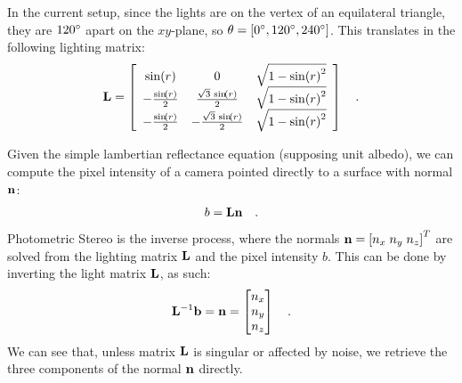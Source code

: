 \documentclass{report}
\begin{document}
In the current setup, since the lights are on the vertex of an equilateral triangle, they are $120\degree$ apart on the $xy$-plane, so $\theta = \left[ 0\degree, 120\degree, 240\degree \right]$. This translates in the following lighting matrix:
\begin{equation}
\B{L} =
\left[\begin{array}{ccc} \sin\!\left(r\right) & 0 & \sqrt{1 - {\sin\!\left(r\right)}^2}\\ -\frac{\sin\!\left(r\right)}{2} & \frac{\sqrt{3}\, \sin\!\left(r\right)}{2} & \sqrt{1 - {\sin\!\left(r\right)}^2}\\ -\frac{\sin\!\left(r\right)}{2} & -\frac{\sqrt{3}\, \sin\!\left(r\right)}{2} & \sqrt{1 - {\sin\!\left(r\right)}^2} \end{array}\right]
\quad .
\end{equation}

Given the simple lambertian reflectance equation (supposing unit albedo), we can compute the pixel intensity of a camera pointed directly to a surface with normal $\mathbf{n}$:
\begin{equation}
b = \mathbf{L}\mathbf{n}
\quad.
\end{equation}
Photometric Stereo is the inverse process, where the normals $\mathbf{n} = \left[ n_x \; n_y \; n_z\right]^T$ are solved from the lighting matrix $\mathbf{L}$ and the pixel intensity $b$. This can be done by inverting the light matrix $\mathbf{L}$, as such:
\begin{equation}
\mathbf{L}^{-1}\mathbf{b} = \mathbf{n} = 
\begin{bmatrix}
n_x \\
n_y \\
n_z 
\end{bmatrix}
\quad.
\end{equation}
We can see that, unless matrix $\mathbf{L}$ is singular or affected by noise, we retrieve the three components of the normal $\mathbf{n}$ directly.
\end{document}
